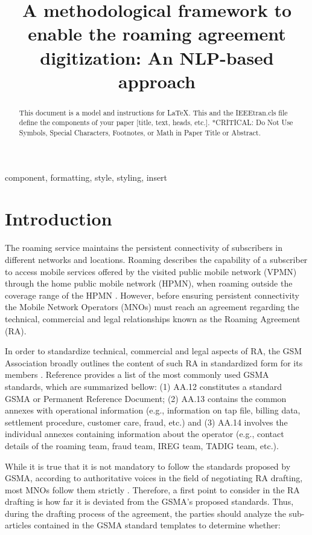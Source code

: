 \documentclass[conference]{style/IEEEtran}
\begin{document}
\title{A methodological framework to enable the roaming agreement digitization: An NLP-based approach\\}

\maketitle

\begin{abstract}
This document is a model and instructions for \LaTeX.
This and the IEEEtran.cls file define the components of your paper [title, text, heads, etc.]. *CRITICAL: Do Not Use Symbols, Special Characters, Footnotes, 
or Math in Paper Title or Abstract.
\end{abstract}

\begin{IEEEkeywords}
component, formatting, style, styling, insert
\end{IEEEkeywords}

\section{Introduction}
The roaming service maintains the persistent connectivity of subscribers in different networks and locations. Roaming describes the capability of a subscriber to access mobile services offered by the visited public mobile network (VPMN) through the home public mobile network (HPMN), when roaming outside the coverage range of the HPMN \cite{Tanaka2013}. However, before ensuring persistent connectivity the Mobile Network Operators (MNOs) must reach an agreement regarding the technical, commercial and legal relationships known as the Roaming Agreement (RA).

In order to standardize technical, commercial and legal aspects of RA, the GSM Association broadly outlines the content of such RA in standardized form for its members \cite{Ferwerda2018}. Reference \cite{ROCCO2017} provides a list of the most commonly used GSMA standards, which are summarized bellow: (1) AA.12 constitutes a standard GSMA or Permanent Reference Document; (2) AA.13 contains the common annexes with operational information (e.g., information on tap file, billing data, settlement procedure, customer care, fraud, etc.) and (3) AA.14 involves the individual annexes containing information about the operator (e.g., contact details of the roaming team, fraud team, IREG team, TADIG team, etc.).

While it is true that it is not mandatory to follow the standards proposed by GSMA, according to authoritative voices in the field of negotiating RA drafting, most MNOs follow them strictly \cite{ROCCO2017a}. Therefore, a first point to consider in the RA drafting is how far it is deviated from the GSMA's proposed standards. Thus, during the drafting process of the agreement, the parties should analyze the sub-articles contained in the GSMA standard templates to determine whether:
\end{document}
